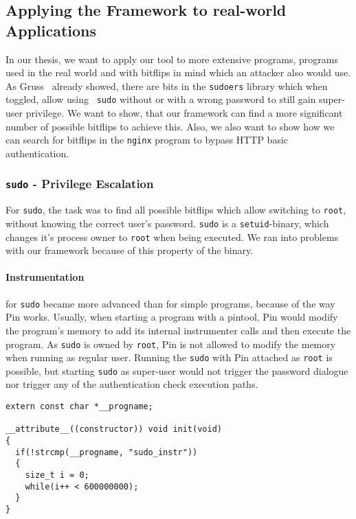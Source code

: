\subsection{Applying the Framework to real-world Applications}

In our thesis, we want to apply our tool to more extensive programs, programs
used in the real world and with bitflips in mind which an attacker also would
use. As Gruss~\etal\cite{flipinthewall} already showed, there are bits in the
\texttt{sudoers} library which when toggled, allow using ~\texttt{sudo} without
or with a wrong password to still gain super-user privilege. We want to show,
that our framework can find a more significant number of possible bitflips to
achieve this. Also, we also want to show how we can search for bitflips in the
\texttt{nginx} program to bypass HTTP basic authentication.

\subsubsection{\texttt{sudo} - Privilege Escalation}

For \texttt{sudo}, the task was to find all possible bitflips which allow
switching to \texttt{root}, without knowing the correct user's password.
\texttt{sudo} is a \texttt{setuid}-binary, which changes it's process owner to
\texttt{root} when being executed. We ran into problems with our framework
because of this property of the binary.

\paragraph{Instrumentation} for \texttt{sudo} became more advanced than for
simple programs, because of the way Pin works. Usually, when starting a program
with a pintool, Pin would modify the program's memory to add its internal
instrumenter calls and then execute the program. As \texttt{sudo} is owned by
\texttt{root}, Pin is not allowed to modify the memory when running as regular
user. Running the \texttt{sudo} with Pin attached as \texttt{root} is possible,
but starting \texttt{sudo} as super-user would not trigger the password dialogue
nor trigger any of the authentication check execution paths.

\begin{minipage}{\linewidth}
\begin{lstlisting}[style=CStyle,
                   caption={Code of the pre-loaded library to keep the process
waiting for some milliseconds, which gives enough time for Pin to attach to the
process.},
label=lst:presleeplib]
extern const char *__progname;

__attribute__((constructor)) void init(void)
{
  if(!strcmp(__progname, "sudo_instr"))
  {
    size_t i = 0;
    while(i++ < 600000000);
  }
}
\end{lstlisting}
\end{minipage}

